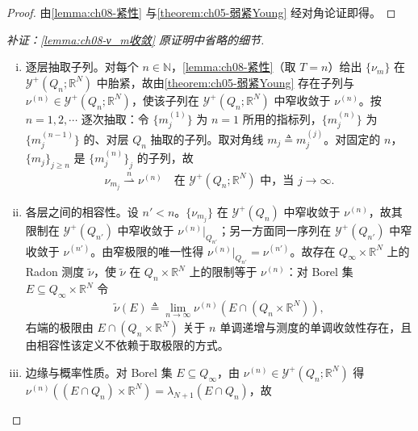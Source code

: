 \documentclass[../../main.tex]{subfiles}%
\begin{document}
\begin{proof}
由\cref{lemma:ch08-紧性} 与\cref{theorem:ch05-弱紧Young} 经对角论证即得。
\end{proof}

\begin{proof}[补证：\cref{lemma:ch08-ν_m收敛} 原证明中省略的细节]
\begin{enumerate}[(i)]
\item 逐层抽取子列。对每个 $n\in\mathbb{N}$，\cref{lemma:ch08-紧性}（取 $T=n$）给出 $\{\nu_m\}$ 在 $\mathcal{Y}^+(Q_n;\mathbb{R}^N)$ 中胎紧，故由\cref{theorem:ch05-弱紧Young} 存在子列与 $\nu^{(n)}\in\mathcal{Y}^+(Q_n;\mathbb{R}^N)$，使该子列在 $\mathcal{Y}^+(Q_n;\mathbb{R}^N)$ 中窄收敛于 $\nu^{(n)}$。按 $n=1,2,\cdots$ 逐次抽取：令 $\{m^{(1)}_j\}$ 为 $n=1$ 所用的指标列，$\{m^{(n)}_j\}$ 为 $\{m^{(n-1)}_j\}$ 的、对层 $Q_n$ 抽取的子列。取对角线 $m_j\triangleq m^{(j)}_j$。对固定的 $n$，$\{m_j\}_{j\geqslant n}$ 是 $\{m^{(n)}_j\}_{j}$ 的子列，故
\begin{align*}
\nu_{m_j}\stackrel{n}{\rightharpoonup}\nu^{(n)}\quad\text{在 }\mathcal{Y}^+(Q_n;\mathbb{R}^N)\text{ 中，当 }j\to\infty.
\end{align*}
\item 各层之间的相容性。设 $n'<n$。$\{\nu_{m_j}\}$ 在 $\mathcal{Y}^+(Q_n)$ 中窄收敛于 $\nu^{(n)}$，故其限制在 $\mathcal{Y}^+(Q_{n'})$ 中窄收敛于 $\nu^{(n)}|_{Q_{n'}}$；另一方面同一序列在 $\mathcal{Y}^+(Q_{n'})$ 中窄收敛于 $\nu^{(n')}$。由窄极限的唯一性得 $\nu^{(n)}|_{Q_{n'}}=\nu^{(n')}$。故存在 $Q_\infty\times\mathbb{R}^N$ 上的 Radon 测度 $\tilde\nu$，使 $\tilde\nu$ 在 $Q_n\times\mathbb{R}^N$ 上的限制等于 $\nu^{(n)}$：对 Borel 集 $E\subseteq Q_\infty\times\mathbb{R}^N$ 令
\begin{align*}
\tilde\nu(E)\triangleq\lim_{n\to\infty}\nu^{(n)}(E\cap(Q_n\times\mathbb{R}^N)),
\end{align*}
右端的极限由 $E\cap(Q_n\times\mathbb{R}^N)$ 关于 $n$ 单调递增与测度的单调收敛性存在，且由相容性该定义不依赖于取极限的方式。
\item 边缘与概率性质。对 Borel 集 $E\subseteq Q_\infty$，由 $\nu^{(n)}\in\mathcal{Y}^+(Q_n;\mathbb{R}^N)$ 得 $\nu^{(n)}((E\cap Q_n)\times\mathbb{R}^N)=\lambda_{N+1}(E\cap Q_n)$，故

\end{enumerate}
\end{proof}
\end{document}
